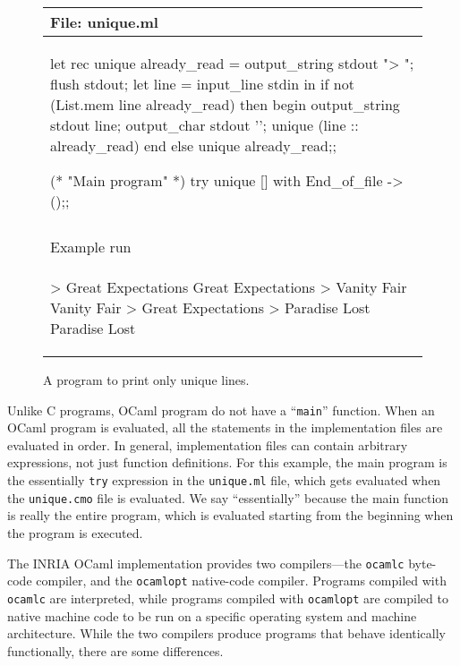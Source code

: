 \begin{figure}
\begin{center}
\begin{tabular}{l}
File: unique.ml\\
\hline
\begin{ocamllisting}
let rec unique already_read =
   output_string stdout "> ";
   flush stdout;
   let line = input_line stdin in
      if not (List.mem line already_read) then begin
         output_string stdout line;
         output_char stdout '\n';
         unique (line :: already_read)
      end else
         unique already_read;;

(* "Main program" *)
try unique [] with
   End_of_file ->
      ();;
\end{ocamllisting}
\\
\\
Example run\\
\hline
\begin{ocamllisting}
> Great Expectations
Great Expectations
> Vanity Fair
Vanity Fair
> Great Expectations
> Paradise Lost
Paradise Lost
\end{ocamllisting}
\end{tabular}
\end{center}
\caption{A program to print only unique lines.}
\end{figure}


 Unlike C programs, OCaml program do
not have a ``\texttt{main}'' function. When an OCaml program is evaluated, all the statements in the
implementation files are evaluated in order.  In general, implementation files can contain arbitrary
expressions, not just function definitions. For this example, the main program is the
essentially \lstinline$try$ expression in the \hbox{\lstinline/unique.ml/} file, which gets
evaluated when the \hbox{\lstinline/unique.cmo/} file is evaluated.  We say ``essentially'' because
the main function is really the entire program, which is evaluated starting from the beginning when
the program is executed.


The INRIA OCaml implementation
provides two compilers---the \hbox{\lstinline/ocamlc/} byte-code
compiler, and the \hbox{\lstinline/ocamlopt/} native-code
compiler.  Programs compiled with \hbox{\lstinline/ocamlc/} are
interpreted, while programs compiled with \hbox{\lstinline/ocamlopt/}
are compiled to native machine code to be run on a specific operating
system and machine architecture.  While the two compilers produce
programs that behave identically functionally, there are some
differences.

